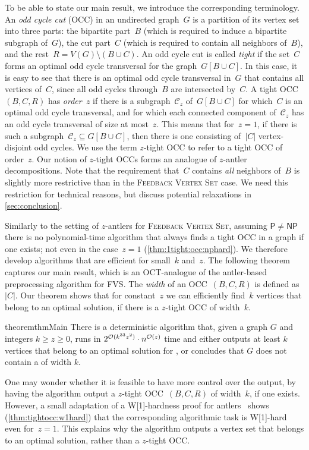 To be able to state our main result, we introduce the corresponding terminology. An \emph{odd cycle cut} (OCC) in an undirected graph~$G$ is a partition of its vertex set into three parts: the bipartite part~$B$ (which is required to induce a bipartite subgraph of~$G$), the cut part~$C$ (which is required to contain all neighbors of~$B$), and the rest~$R = V(G) \setminus (B \cup C)$. An odd cycle cut is called \emph{tight} if the set~$C$ forms an optimal odd cycle transversal for the graph~$G[B \cup C]$. In this case, it is easy to see that there is an optimal odd cycle transversal in~$G$ that contains all vertices of~$C$, since all odd cycles through~$B$ are intersected by~$C$. A tight OCC~$(B,C,R)$ has \emph{order~$z$} if there is a subgraph~$\mathcal{C}_z$ of~$G[B \cup C]$ for which~$C$ is an optimal odd cycle transversal, and for which each connected component of~$\mathcal{C}_z$ has an odd cycle transversal of size at most~$z$. This means that for~$z=1$, if there is such a subgraph~$\mathcal{C}_z \subseteq G[B \cup C]$, then there is one consisting of~$|C|$ vertex-disjoint odd cycles. We use the term $z$-tight OCC to refer to a tight OCC of order~$z$. Our notion of $z$-tight OCCs forms an analogue of $z$-antler decompositions. Note that the requirement that~$C$ contains \emph{all} neighbors of~$B$ is slightly more restrictive than in the \textsc{Feedback Vertex Set} case. We need this restriction for technical reasons, but discuss potential relaxations in \cref{sec:conclusion}.

Similarly to the setting of $z$-antlers for \textsc{Feedback Vertex Set}, assuming $\mathsf{P} \neq \mathsf{NP}$ there is no polynomial-time algorithm that always finds a tight OCC in a graph if one exists; not even in the case~$z=1$ (\cref{thm:1tight:occ:nphard}). We therefore develop algorithms that are efficient for small~$k$ and~$z$. The following theorem captures our main result, which is an OCT-analogue of the antler-based preprocessing algorithm for FVS. The \emph{width} of an OCC~$(B,C,R)$ is defined as~$|C|$. Our theorem shows that for constant~$z$ we can efficiently find~$k$ vertices that belong to an optimal solution, if there is a $z$-tight OCC of width~$k$.
%
\begin{restatable}{theorem}{thmMain}
  \label{thm:main}
  There is a deterministic algorithm that, given a graph $G$ and integers $k \geq z \geq 0$, runs in $2^{\mathcal{O}(k^{33} z^2)}\cdot n^{\mathcal{O}{(z)}}$ time and either outputs at least $k$ vertices that belong to an optimal solution for \PrbOCTLong, or concludes that $G$ does not contain a \zocc of width $k$.
\end{restatable}
%
One may wonder whether it is feasible to have more control over the output, by having the algorithm output a $z$-tight OCC~$(B,C,R)$ of width~$k$, if one exists. However, a small adaptation of a W[1]-hardness proof for antlers~\cite[Theorem 3.7]{DonkersJ24} shows (\cref{thm:tightocc:w1hard}) that the corresponding algorithmic task is W[1]-hard even for~$z=1$. This explains why the algorithm outputs a vertex set that belongs to an optimal solution, rather than a $z$-tight OCC.

